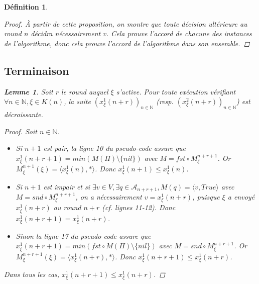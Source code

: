\documentclass{article}
\newtheorem{lemma}{Lemme}
\newtheorem{definition}{Définition}
\begin{document}
\begin{definition}
\begin{proof}
	À partir de cette proposition, on montre que toute décision ultérieure au round $n$ décidra nécessairement $v$. Cela prouve l'accord de chacune des instances de l'algorithme,
	donc cela prouve l'accord de l'algorithme dans son ensemble.
\end{proof}

\subsection{Terminaison}

	\begin{lemma}
		Soit $r$ le round auquel $\xi$ s'active.
		Pour toute exécution vérifiant $\forall n \in \mathds{N}, \xi \in K(n)$,
		la suite $(x^1_\xi(n+r))_{n \in \mathds{N}}$ (resp. $(x^2_\xi(n+r))_{n \in \mathds{N}}$) est décroissante.
	\end{lemma}
	\begin{proof}
		Soit $n \in \mathds{N}$.
		\begin{itemize}

			\item Si $n+1$ est pair, la ligne 10 du pseudo-code assure que $x^1_\xi(n+r+1) = min(M(\Pi) \setminus \{nil\})$ avec $M = fst \circ M_\xi^{n+r+1}$.
				Or $M_\xi^{n+1}(\xi) = \langle x^1_\xi(n), * \rangle$.
				Donc $x^1_\xi(n+1) \leq x^1_\xi(n)$.
			\item Si $n+1$ est impair et si $\exists v \in V, \exists q \in \mathcal{A}_{n+r+1}, M(q) = \langle v, True \rangle$ avec $M = snd \circ M_\xi^{n+r+1}$,
				on a nécessairement $v = x^1_\xi(n+r)$, puisque $\xi$ a envoyé $x^1_\xi(n+r)$ au round $n+r$ (cf. lignes 11-12).
				Donc $x^1_\xi(n+r+1) = x^1_\xi(n+r)$.
			\item Sinon la ligne 17 du pseudo-code assure que $x^1_\xi(n+r+1) = min(fst \circ M(\Pi) \setminus \{nil\})$ avec $M = snd \circ M_\xi^{n+r+1}$.
				Or $M_\xi^{n+r+1}(\xi) = \langle x^1_\xi(n+r), * \rangle$.
				Donc $x^1_\xi(n+r+1) \leq x^1_\xi(n+r)$.

		\end{itemize}
		Dans tous les cas, $x^1_\xi(n+r+1) \leq x^1_\xi(n+r)$.
	\end{proof}
		


\end{definition}
\end{document}
